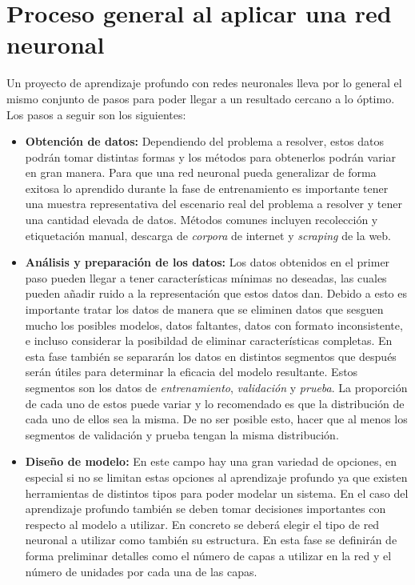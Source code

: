 \section{Proceso general al aplicar una red neuronal}
\label{sec:nlpprocess}

Un proyecto de aprendizaje profundo con redes neuronales lleva por lo general el mismo conjunto de pasos para poder llegar a un resultado cercano a lo óptimo. Los pasos a seguir son los siguientes:

\begin{itemize}
\item \textbf{Obtención de datos:} Dependiendo del problema a resolver, estos datos podrán tomar distintas formas y los métodos para obtenerlos podrán variar en gran manera. Para que una red neuronal pueda generalizar de forma exitosa lo aprendido durante la fase de entrenamiento es importante tener una muestra representativa del escenario real del problema a resolver y tener una cantidad elevada de datos. Métodos comunes incluyen recolección y etiquetación manual, descarga de \textit{corpora} de internet y \textit{\gls{scraping}} de la web.

\item \textbf{Análisis y preparación de los datos:} Los datos obtenidos en el primer paso pueden llegar a tener características mínimas no deseadas, las cuales pueden añadir ruido a la representación que estos datos dan. Debido a esto es importante tratar los datos de manera que se eliminen datos que sesguen mucho los posibles modelos, datos faltantes, datos con formato inconsistente, e incluso considerar la posibildad de eliminar características completas. En esta fase también se separarán los datos en distintos segmentos que después serán útiles para determinar la eficacia del modelo resultante. Estos segmentos son los datos de \textit{entrenamiento}, \textit{validación} y \textit{prueba}. La proporción de cada uno de estos puede variar y lo recomendado es que la distribución de cada uno de ellos sea la misma. De no ser posible esto, hacer que al menos los segmentos de validación y prueba tengan la misma distribución.

\item \textbf{Diseño de modelo:} En este campo hay una gran variedad de opciones, en especial si no se limitan estas opciones al aprendizaje profundo ya que existen herramientas de distintos tipos para poder modelar un sistema. En el caso del aprendizaje profundo también se deben tomar decisiones importantes con respecto al modelo a utilizar. En concreto se deberá elegir el tipo de red neuronal a utilizar como también su estructura. En esta fase se definirán de forma preliminar detalles como el número de capas a utilizar en la red y el número de unidades por cada una de las capas.


\end{itemize}
